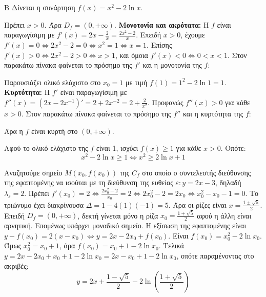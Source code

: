 \begin{thema}{Β}
Δίνεται η συνάρτηση $f(x) = x^2 - 2\ln x$.

\begin{erwthma}
\item Πρέπει $x > 0$. Άρα $D_f = (0, +\infty)$.
\textbf{Μονοτονία και ακρότατα:}
Η $f$ είναι παραγωγίσιμη με $f'(x) = 2x - \frac{2}{x} = \frac{2x^2-2}{x}$.
Επειδή $x>0$, έχουμε $f'(x) = 0 \Leftrightarrow 2x^2-2 = 0 \Leftrightarrow x^2 = 1 \Leftrightarrow x = 1$.
Επίσης $f'(x) > 0 \Leftrightarrow 2x^2-2 > 0 \Leftrightarrow x > 1$, και όμοια $f'(x) < 0 \Leftrightarrow 0 < x < 1$.
Στον παρακάτω πίνακα φαίνεται το πρόσημο της $f'$ και η μονοτονία της $f$:
\begin{center}
\end{center}
Παρουσιάζει ολικό ελάχιστο στο $x_0 = 1$ με τιμή $f(1) = 1^2 - 2\ln 1 = 1$.
\textbf{Κυρτότητα:}
Η $f'$ είναι παραγωγίσιμη με $f''(x) = (2x - 2x^{-1})' = 2 + 2x^{-2} = 2 + \frac{2}{x^2}$.
Προφανώς $f''(x) > 0$ για κάθε $x > 0$. 
Στον παρακάτω πίνακα φαίνεται το πρόσημο της $f''$ και η κυρτότητα της $f$:
\begin{center}
\end{center}
Άρα η $f$ είναι κυρτή στο $(0, +\infty)$.

\item Αφού το ολικό ελάχιστο της $f$ είναι 1, ισχύει $f(x) \ge 1$ για κάθε $x > 0$.
Οπότε:
\[ x^2 - 2\ln x \ge 1 \Leftrightarrow x^2 \ge 2\ln x + 1 \]

\item Αναζητούμε σημείο $M(x_0, f(x_0))$ της $C_f$ στο οποίο ο συντελεστής διεύθυνσης της εφαπτομένης να ισούται με τη διεύθυνση της ευθείας $\varepsilon: y=2x-3$, δηλαδή $\lambda_\varepsilon = 2$.
Πρέπει $f'(x_0) = 2 \Leftrightarrow \frac{2x_0^2-2}{x_0} = 2 \Leftrightarrow 2x_0^2 - 2 = 2x_0 \Leftrightarrow x_0^2 - x_0 - 1 = 0$.
Το τριώνυμο έχει διακρίνουσα $\Delta = 1 - 4(1)(-1) = 5$. Άρα οι ρίζες είναι $x = \frac{1 \pm \sqrt{5}}{2}$.
Επειδή $D_f = (0, +\infty)$, δεκτή γίνεται μόνο η ρίζα $x_0 = \frac{1+\sqrt{5}}{2}$ αφού η άλλη είναι αρνητική. Επομένως υπάρχει μοναδικό σημείο.
Η εξίσωση της εφαπτομένης είναι $y - f(x_0) = 2(x - x_0) \Leftrightarrow y = 2x - 2x_0 + f(x_0)$.
Είναι $f(x_0) = x_0^2 - 2\ln x_0$. Όμως $x_0^2 = x_0 + 1$, άρα $f(x_0) = x_0 + 1 - 2\ln x_0$.
Τελικά $y = 2x - 2x_0 + x_0 + 1 - 2\ln x_0 = 2x - x_0 + 1 - 2\ln x_0$, οπότε παραμένοντας στο ακριβές:
\[ y = 2x + \frac{1-\sqrt{5}}{2} - 2\ln\left( \frac{1+\sqrt{5}}{2} \right) \]


\end{erwthma}
\end{thema}

